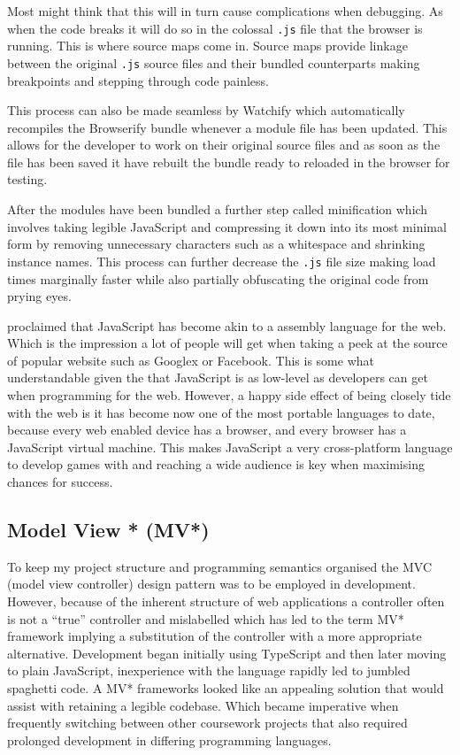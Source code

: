 \documentclass[final]{cmpreport}
\begin{document}
Most might think that this will in turn cause complications when debugging. As when the code breaks it will do so in the colossal \texttt{.js} file that the browser is running. This is where source maps come in. Source maps provide linkage between the original \texttt{.js} source files and their bundled counterparts making breakpoints and stepping through code painless. \cite{Seddon}

This process can also be made seamless by Watchify which automatically recompiles the Browserify bundle whenever a module file has been updated. This allows for the developer to work on their original source files and as soon as the file has been saved it have rebuilt the bundle ready to reloaded in the browser for testing.

After the modules have been bundled a further step called minification which involves taking legible JavaScript and compressing it down into its most minimal form by removing unnecessary characters such as a whitespace and shrinking instance names. This process can further decrease the \texttt{.js} file size making load times marginally faster while also partially obfuscating the original code from prying eyes.

\cite{Hanselman} proclaimed that JavaScript has become akin to a assembly language for the web. Which is the impression a lot of people will get when taking a peek at the source of popular website such as Googlex or Facebook. This is some what understandable given the that JavaScript is as low-level as developers can get when programming for the web. However, a happy side effect of being closely tide with the web is it has become now one of the most portable languages to date, because every web enabled device has a browser, and every browser has a JavaScript virtual machine. This makes JavaScript a very cross-platform language to develop games with and reaching a wide audience is key when maximising chances for success.

\subsection{Model View * (MV*)}
To keep my project structure and programming semantics organised the MVC (model view controller) design pattern was to be employed in development. However, because of the inherent structure of web applications a controller often is not a ``true'' controller and mislabelled which has led to the term MV* framework implying a substitution of the controller with a more appropriate alternative. Development began initially using TypeScript and then later moving to plain JavaScript, inexperience with the language rapidly led to jumbled spaghetti code. A MV* frameworks looked like an appealing solution that would assist with retaining a legible codebase.  Which became imperative when frequently switching between other coursework projects that also required prolonged development in differing programming languages.
\end{document}
